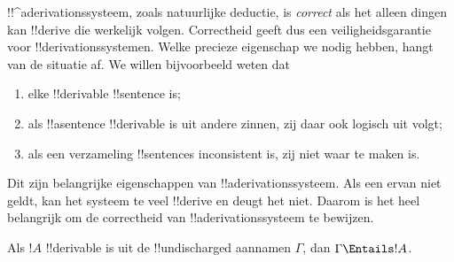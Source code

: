 \documentclass[../../../include/open-logic-section]{subfiles}
\begin{document}
      {}
      {}
      

\begin{explain}
!!^a{derivation}ssysteem, zoals natuurlijke deductie, is
\emph{correct} als het alleen dingen kan !!{derive} die werkelijk
volgen. Correctheid geeft dus een veiligheidsgarantie voor
!!{derivation}ssystemen. Welke precieze eigenschap we nodig hebben,
hangt van de situatie af. We willen bijvoorbeeld weten dat
\begin{enumerate}
\item elke !!{derivable} !!{sentence}
   is;
\item als !!a{sentence} !!{derivable} is uit andere zinnen, zij daar
  ook logisch uit volgt;
\item als een verzameling !!{sentence}s inconsistent is, zij niet waar
  te maken is.
\end{enumerate}
Dit zijn belangrijke eigenschappen van !!a{derivation}ssysteem. Als
een ervan niet geldt, kan het systeem te veel !!{derive} en deugt het
niet. Daarom is het heel belangrijk om de correctheid van
!!a{derivation}ssysteem te bewijzen.
\end{explain}

\begin{thm}[Correctheid]
Als $!A$ !!{derivable} is uit de !!{undischarged} aannamen
$\Gamma$, dan $\Gamma \Entails !A$.
\end{thm}
\end{document}
